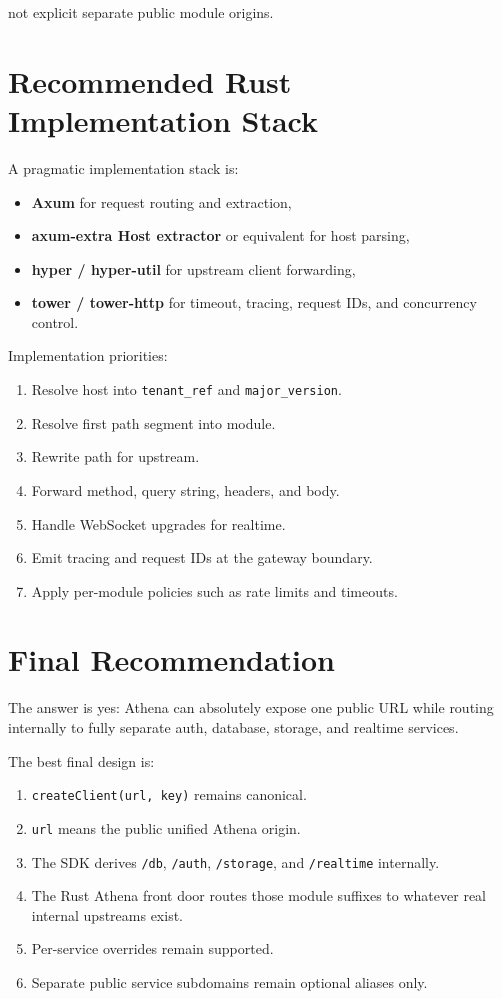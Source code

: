 \documentclass[11pt]{article}
\begin{document}
not explicit separate public module origins.

\section{Recommended Rust Implementation Stack}

A pragmatic implementation stack is:

\begin{itemize}[leftmargin=1.5em]
  \item \textbf{Axum} for request routing and extraction,
  \item \textbf{axum-extra Host extractor} or equivalent for host parsing,
  \item \textbf{hyper / hyper-util} for upstream client forwarding,
  \item \textbf{tower / tower-http} for timeout, tracing, request IDs, and concurrency control.
\end{itemize}

Implementation priorities:

\begin{enumerate}[leftmargin=1.5em]
  \item Resolve host into \texttt{tenant\_ref} and \texttt{major\_version}.
  \item Resolve first path segment into module.
  \item Rewrite path for upstream.
  \item Forward method, query string, headers, and body.
  \item Handle WebSocket upgrades for realtime.
  \item Emit tracing and request IDs at the gateway boundary.
  \item Apply per-module policies such as rate limits and timeouts.
\end{enumerate}

\section{Final Recommendation}

The answer is yes: Athena can absolutely expose one public URL while routing internally to fully separate auth, database, storage, and realtime services.

The best final design is:

\begin{enumerate}[leftmargin=1.5em]
  \item \texttt{createClient(url, key)} remains canonical.
  \item \texttt{url} means the public unified Athena origin.
  \item The SDK derives \texttt{/db}, \texttt{/auth}, \texttt{/storage}, and \texttt{/realtime} internally.
  \item The Rust Athena front door routes those module suffixes to whatever real internal upstreams exist.
  \item Per-service overrides remain supported.
  \item Separate public service subdomains remain optional aliases only.
\end{enumerate}
\end{document}
